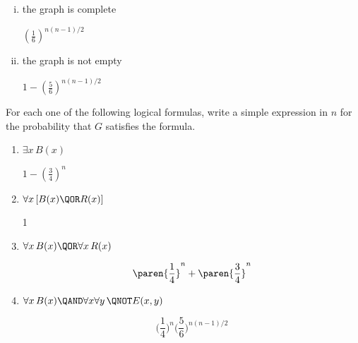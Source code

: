 \begin{problem}
\begin{enumerate}[(i)]
\item  the graph is complete
\begin{solution}
	$(\tfrac{1}{6})^{n(n-1)/2}$
\end{solution}\brule{0.5in}

%

%

\item the graph is not empty
\begin{solution}
$1 - (\tfrac{5}{6})^{n(n-1)/2}$
\end{solution}\brule{0.5in}

\end{enumerate}

\ppart For each one of the following logical formulas, write a simple
expression in $n$ for the probability that $G$ satisfies the formula.

\begin{enumerate}

\item
$\exists x\, B(x)$ \brule{0.5in}

\begin{solution}
$1 - (\tfrac{3}{4})^n$
\end{solution}

\item  $\forall x\, [B(x) \QOR R(x)]$ \brule{0.5in}

\begin{solution}
1
\end{solution}

\item  $\forall x\, B(x) \QOR \forall x\, R(x)$\brule{0.5in}

\begin{solution}
\[
\paren{\frac{1}{4}}^n + \paren{\frac{3}{4}}^n
\]
\end{solution}

\item $\forall x\, B(x) \QAND \forall x\forall y\, \QNOT E(x,y)$\brule{0.5in}

\begin{solution}
\[
\bigl(\frac{1}{4}\bigr)^n\bigl(\frac{5}{6}\bigr)^{n(n-1)/2}
\]
\end{solution}


\end{enumerate}
\end{problem}
